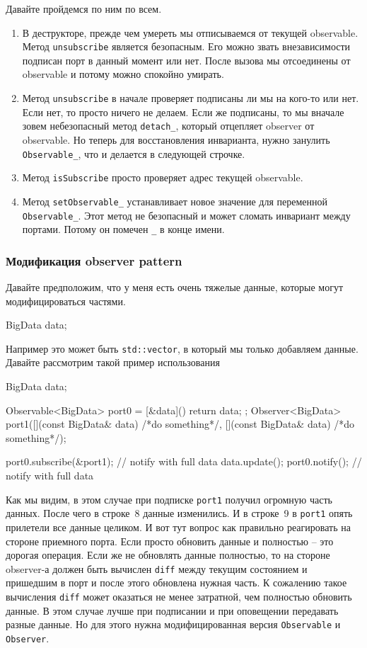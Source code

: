 Давайте пройдемся по ним по всем.
\begin{enumerate}
\item В деструкторе, прежде чем умереть мы отписываемся от текущей observable.
Метод \verb"unsubscribe" является безопасным.
Его можно звать внезависимости подписан порт в данный момент или нет.
После вызова мы отсоединены от observable и потому можно спокойно умирать.

\item Метод \verb"unsubscribe" в начале проверяет подписаны ли мы на кого-то или нет.
Если нет, то просто ничего не делаем.
Если же подписаны, то мы вначале зовем небезопасный метод \verb"detach_", который отцепляет observer от observable.
Но теперь для восстановления инварианта, нужно занулить \verb"Observable_", что и делается в следующей строчке.

\item Метод \verb"isSubscribe" просто проверяет адрес текущей observable.

\item Метод \verb"setObservable_" устанавливает новое значение для переменной \verb"Observable_".
Этот метод не безопасный и может сломать инвариант между портами.
Потому он помечен \verb"_" в конце имени.
\end{enumerate}

\subsubsection{Модификация observer pattern}

Давайте предположим, что у меня есть очень тяжелые данные, которые могут модифицироваться частями.
\begin{cppcode}
BigData data;
\end{cppcode}
Например это может быть \verb"std::vector", в который мы только добавляем данные.
Давайте рассмотрим такой пример использования
\begin{cppcode}
BigData data;

Observable<BigData> port0 = [&data]() { return data; };
Observer<BigData> port1([](const BigData& data){ /*do something*/},
                        [](const BigData& data){ /*do something*/});

port0.subscribe(&port1); // notify with full data
data.update();
port0.notify(); // notify with full data
\end{cppcode}
Как мы видим, в этом случае при подписке \verb"port1" получил огромную часть данных.
После чего в строке~8 данные изменились.
И в строке~9 в \verb"port1" опять прилетели все данные целиком.
И вот тут вопрос как правильно реагировать на стороне приемного порта.
Если просто обновить данные и полностью -- это дорогая операция.
Если же не обновлять данные полностью, то на стороне observer-а должен быть вычислен \verb"diff" между текущим состоянием и пришедшим в порт и после этого обновлена нужная часть.
К сожалению такое вычисления \verb"diff" может оказаться не менее затратной, чем полностью обновить данные.
В этом случае лучше при подписании и при оповещении передавать разные данные.
Но для этого нужна модифицированная версия \verb"Observable" и \verb"Observer".

